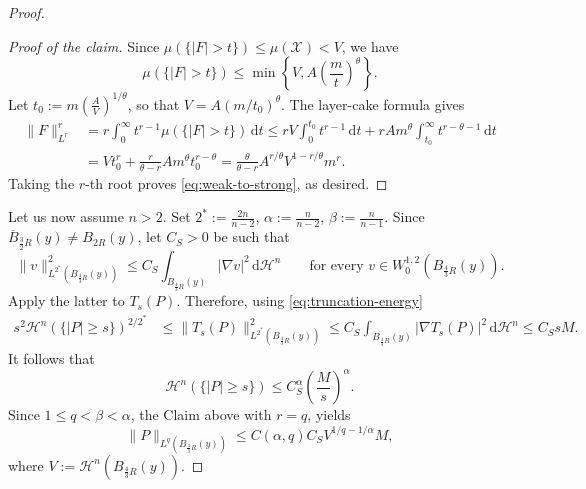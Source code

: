 \documentclass[12pt,a4paper,reqno]{amsart}
\renewcommand{\leq}{\leqslant}
\renewcommand{\geq}{\geqslant}
\begin{document}
\begin{proof}
\begin{proof}[Proof of the claim]
Since $\mu(\{|F|>t\})\leq \mu(\mathcal{X})<V$, we have
\[
 \mu(\{|F|>t\})
 \leq\min\left\{V,A\left(\frac mt\right)^\theta\right\}.
\]
Let $
 t_0:=m\left(\frac AV\right)^{1/\theta}$,
so that $V=A(m/t_0)^\theta$.  The layer-cake formula gives
\begin{align*}
 \|F\|_{L^r}^r
 &=r\int_0^\infty
       t^{r-1}\mu(\{|F|>t\})\,\mathrm{d}t\leq rV\int_0^{t_0}t^{r-1}\,\mathrm{d}t
   +rAm^\theta\int_{t_0}^\infty t^{r-\theta-1}\,\mathrm{d}t\\
 &=Vt_0^r+\frac{r}{\theta-r}Am^\theta t_0^{r-\theta}=\frac{\theta}{\theta-r}
   A^{r/\theta}V^{1-r/\theta}m^r.
\end{align*}
Taking the $r$-th root proves \eqref{eq:weak-to-strong}, as desired.
\end{proof}
Let us now assume $n>2$.
Set $
 2^*:=\frac{2n}{n-2}$, $\alpha:=\frac{n}{n-2}$, $\beta:=\frac{n}{n-1}$.
Since $\overline{B}_{\frac{3}{2}R}(y)\neq B_{2R}(y)$, let $C_S>0$ be such that
\[
 \|v\|_{L^{2^*}(B_{\frac{4}{3}R}(y))}^2
 \leq C_S\int_{B_{\frac{4}{3}R}(y)}|\nabla v|^2\,\mathrm{d}\mathcal{H}^n
 \qquad\text{for every }v\in W^{1,2}_0(B_{\frac{4}{3}R}(y)).
\]
Apply the latter to $T_s(P)$.  Therefore, using \eqref{eq:truncation-energy}
\[
\begin{aligned}
 s^2\mathcal{H}^n(\{|P|\geq s\})^{2/2^*}
 &\leq \|T_s(P)\|_{L^{2^*}(B_{\frac{4}{3}R}(y))}^2\leq C_S\int_{B_{\frac{4}{3}R}(y)}|\nabla T_s(P)|^2\,\mathrm{d}\mathcal{H}^n\leq C_SsM.
\end{aligned}
\]
It follows that
\begin{equation}\label{eq:P-tail}
 \mathcal{H}^n(\{|P|\geq s\})
 \leq C_S^{\alpha}\left(\frac{M}{s}\right)^\alpha.
\end{equation}
Since $
 1\leq q<\beta<\alpha$,
the Claim above with $r=q$, yields
\begin{equation}\label{eq:P-Lq}
 \|P\|_{L^q(B_{\frac{4}{3}R}(y))}
 \leq C(\alpha,q)C_S
       V^{1/q-1/\alpha}M,
\end{equation}
where $V:=\mathcal{H}^n(B_{\frac{4}{3}R}(y))$.


\end{proof}
\end{document}
